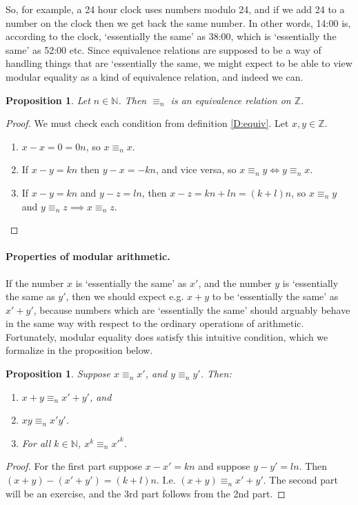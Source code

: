 \documentclass{article}
\theoremstyle{plain}
\newtheorem{proposition}[theorem]{Proposition}{\bfseries}{\itshape}
\newcommand{\bN}{\mathbb{N}}
\newcommand{\bZ}{\mathbb{Z}}
\begin{document}
So, for example, a 24 hour clock uses numbers modulo 24, and if we add 24 to a number on the clock then we get back the same number. In other words, 14:00 is, according to the clock, `essentially the same' as 38:00, which is `essentially the same' as 52:00 etc. Since equivalence relations are supposed to be a way of handling things that are `essentially the same, we might expect to be able to view modular equality as a kind of equivalence relation, and indeed we can.  

\begin{proposition}\label{P:cong}
Let $n\in \bN$. Then $\equiv_n$ is an equivalence relation on $\bZ$.
\end{proposition}
\begin{proof}
We must check each condition from definition \ref{D:equiv}. Let $x,y\in\bZ$.
\begin{enumerate}
\item $x-x = 0 = 0n$, so $x\equiv_n x$.
\item If $x - y = kn$ then $y - x = -kn$, and vice versa, so $x\equiv_n y\iff y\equiv_n x$.
\item If $x-y = kn$ and $y-z = ln$, then $x - z= kn + ln = (k+l)n$, so $x\equiv_n y$ and $y\equiv_n z\implies x\equiv_n z$.
\end{enumerate}
\end{proof}

\paragraph{Properties of modular arithmetic.} If the number $x$ is `essentially the same' as $x'$, and the number $y$ is `essentially the same as $y'$, then we should expect e.g. $x+y$ to be `essentially the same' as $x'+y'$, because numbers which are `essentially the same' should arguably behave in the same way with respect to the ordinary operations of arithmetic. Fortunately, modular equality does satisfy this intuitive condition, which we formalize in the proposition below. 

\begin{proposition}\label{P:subs}
Suppose $x\equiv_n x'$, and $y\equiv_n y'$. Then:
\begin{enumerate}
\item $x + y \equiv_n x' + y'$, and
\item $xy \equiv_n x'y'$.
\item For all $k\in \bN$, \/ $x^k\equiv_n x'^k$.
\end{enumerate}
\end{proposition}
\begin{proof}
For the first part suppose $x-x' = kn$ and suppose $y-y' =ln$. Then $(x+y)-(x'+y')=(k+l)n$. I.e. $(x+y)\equiv_n x'+y'$. The second part will be an exercise, and the 3rd part follows from the 2nd part.
\end{proof}
\end{document}
